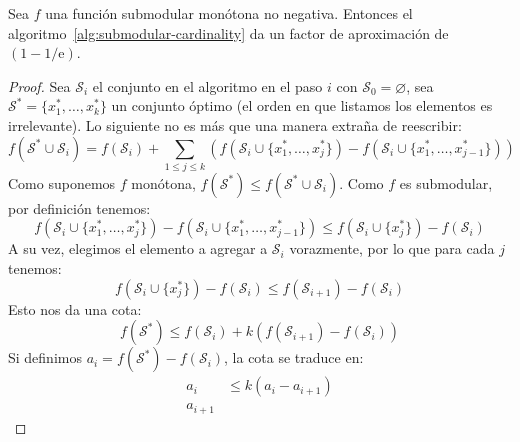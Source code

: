   \begin{theorem}
    \label{theo:submodular-cardinality-approximation}
    Sea \(f\) una función submodular monótona no negativa.
    Entonces el algoritmo~\ref{alg:submodular-cardinality}
    da un factor de aproximación de \((1 - 1 / \mathrm{e})\).
  \end{theorem}
  \begin{proof}
    Sea \(\mathscr{S}_i\) el conjunto en el algoritmo en el paso \(i\)
    con \(\mathscr{S}_0 = \varnothing\),
    sea \(\mathscr{S}^* = \{ x_1^*, \dotsc, x_k^* \}\)
    un conjunto óptimo
    (el orden en que listamos los elementos es irrelevante).
    Lo siguiente no es más que una manera extraña de reescribir:
    \begin{equation}
      \label{eq:sma-1}
      f(\mathscr{S}^* \cup \mathscr{S}_i)
        = f(\mathscr{S}_i)
           + \sum_{1 \le j \le k}
               \left(
                 f(\mathscr{S}_i \cup \{ x_1^*, \dotsc, x_j^* \})
                   - f(\mathscr{S}_i \cup \{ x_1^*, \dotsc, x_{j - 1}^* \})
               \right)
    \end{equation}
    Como suponemos \(f\) monótona,
    \(f(\mathscr{S}^*) \le f(\mathscr{S}^* \cup \mathscr{S}_i)\).
    Como \(f\) es submodular,
    por definición tenemos:
    \begin{equation*}
      f(\mathscr{S}_i \cup \{ x_1^*, \dotsc, x_j^* \})
           - f(\mathscr{S}_i \cup \{ x_1^*, \dotsc, x_{j - 1}^* \})
        \le f(\mathscr{S}_i \cup \{  x_j^* \})
              - f(\mathscr{S}_i)
    \end{equation*}
    A su vez,
    elegimos el elemento a agregar a \(\mathscr{S}_i\)
    vorazmente,
    por lo que para cada \(j\) tenemos:
    \begin{equation*}
      f(\mathscr{S}_i \cup \{  x_j^* \})
         - f(\mathscr{S}_i)
        \le f(\mathscr{S}_{i + 1})
              - f(\mathscr{S}_i)
    \end{equation*}
    Esto nos da una cota:
    \begin{equation*}
      f(\mathscr{S}^*)
        \le f(\mathscr{S}_i)
              + k \left(
                    f(\mathscr{S}_{i + 1})
                      - f(\mathscr{S}_i)
                  \right)
    \end{equation*}
    Si definimos \(a_i = f(\mathscr{S}^*) - f(\mathscr{S}_i)\),
    la cota se traduce en:
    \begin{align*}
      a_i
        &\le k (a_i - a_{i + 1}) \\
      a_{i + 1}

\end{align*}
\end{proof}
